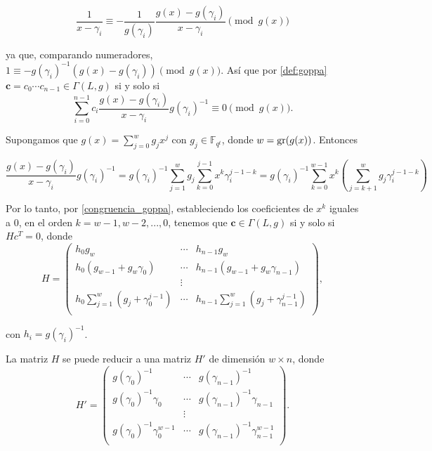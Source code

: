 \[
    \frac{1}{x - \gamma_i} \equiv - \frac{1}{g(\gamma_i)} \frac{g(x) - g(\gamma_i)}{x - \gamma_i} \pmod{ g(x)}
\]

ya que, comparando numeradores, $1 \equiv - g(\gamma_i)^{-1} \left( g(x) - g(\gamma_i) \right) \pmod{g(x)}$. Así que por \eqref{def:goppa} $\textbf{c} = c_0 \cdots c_{n-1} \in \Gamma(L,g)$ si y solo si
\begin{equation}
    \label{congruencia_goppa}
    \sum_{i=0}^{n-1} c_i \frac{g(x) - g(\gamma_i)}{x - \gamma_i} g(\gamma_i)^{-1} \equiv 0 \pmod{g(x)}.
\end{equation}

Supongamos que $g(x) = \sum_{j=0}^w g_j x^j$ con $g_j \in \mathbb{F}_{q^t}$, donde $w = \operatorname{gr}(g(x))$. Entonces

\[
    \frac{g(x) - g(\gamma_i)}{x - \gamma_i} g(\gamma_i)^{-1} = g(\gamma_i)^{-1} \sum_{j=1}^w g_j \sum_{k=0}^{j-1} x^k \gamma_i^{j-1-k} = g(\gamma_i)^{-1} \sum_{k=0}^{w-1} x^k \left( \sum_{j=k+1}^w g_j \gamma_i^{j-1-k} \right)
\]

Por lo tanto, por \eqref{congruencia_goppa}, estableciendo los coeficientes de $x^k$ iguales a $0$, en el orden $k = w - 1, w - 2, ..., 0$, tenemos que $\textbf{c} \in \Gamma(L,g)$ si y solo si $Hc^T = 0$, donde 
\begin{equation}
    H = \left(
        \begin{array}{ccc} 
            h_0 g_w & \cdots & h_{n-1} g_w  \\
            h_0 (g_{w-1} + g_w \gamma_0) & \cdots & h_{n-1} (g_{w-1} + g_w \gamma_{n-1}) \\
            & \vdots & \\
            h_0 \sum_{j=1}^w \left( g_j + \gamma_0^{j-1} \right) & \cdots & h_{n-1} \sum_{j=1}^w \left( g_{j} + \gamma_{n-1}^{j-1} \right) \\
        \end{array}
        \right),
\end{equation}

con $h_i = g(\gamma_i)^{-1}$.


\begin{proposition}
    La matriz $H$ se puede reducir a una matriz $H'$ de dimensión $w \times n$, donde 
    \begin{equation}
        H' = \left(
            \begin{array}{ccc} 
                g(\gamma_0)^{-1} & \cdots & g(\gamma_{n-1})^{-1}  \\
                g(\gamma_0)^{-1} \gamma_0 & \cdots & g(\gamma_{n-1})^{-1} \gamma_{n-1} \\
                & \vdots & \\
                g(\gamma_0)^{-1} \gamma_0^{w-1} & \cdots & g(\gamma_{n-1})^{-1} \gamma_{n-1}^{w-1} \\
            \end{array}
            \right).
    \end{equation}
\end{proposition}

